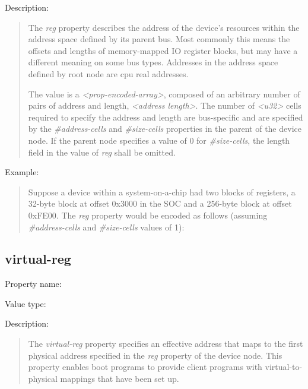 \documentclass[a4paper,10pt,oneside]{sphinxmanual}
\begin{document}
Description:
\begin{quote}

The \emph{reg} property describes the address of the device’s resources
within the address space defined by its parent bus. Most commonly this
means the offsets and lengths of memory-mapped IO register blocks, but
may have a different meaning on some bus types. Addresses in the address
space defined by root node are cpu real addresses.

The value is a \emph{\textless{}prop-encoded-array\textgreater{}}, composed of an arbitrary number
of pairs of address and length, \emph{\textless{}address length\textgreater{}}. The number of
\emph{\textless{}u32\textgreater{}} cells required to specify the address and length are
bus-specific and are specified by the \emph{\#address-cells} and \emph{\#size-cells}
properties in the parent of the device node. If the parent node
specifies a value of 0 for \emph{\#size-cells}, the length field in the value
of \emph{reg} shall be omitted.
\end{quote}

Example:
\begin{quote}

Suppose a device within a system-on-a-chip had two blocks of registers, a
32-byte block at offset 0x3000 in the SOC and a 256-byte block at offset
0xFE00. The \emph{reg} property would be encoded as follows (assuming
\emph{\#address-cells} and \emph{\#size-cells} values of 1):
\begin{quote}

\end{quote}
\end{quote}


\subsection{virtual-reg}
\label{devicetree-basics:sect-standard-properties-virtual-reg}\label{devicetree-basics:virtual-reg}
Property name: 

Value type: 

Description:
\begin{quote}

The \emph{virtual-reg} property specifies an effective address that maps to
the first physical address specified in the \emph{reg} property of the device
node. This property enables boot programs to provide client programs
with virtual-to-physical mappings that have been set up.
\end{quote}
\end{document}
